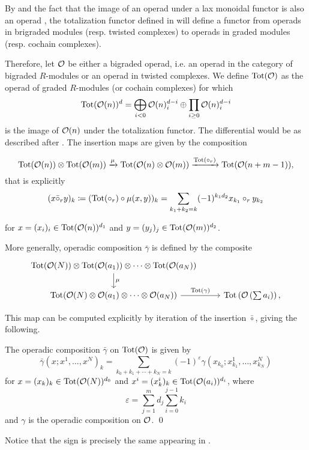 \documentclass[Thesis.tex]{subfiles}
\begin{document}
By  and the fact that the image of an operad under a lax monoidal functor is also an operad \cite[Proposition 3.1.1(a)]{fresse}, the totalization functor defined in  will define a functor from operads in brigraded modules (resp. twisted complexes) to operads in graded modules (resp. cochain complexes).

Therefore, let ${\mathcal O}$ be either a bigraded operad, i.e. an operad in the category of bigraded $R$-modules or an operad in twisted complexes. We define $\operatorname{Tot}({\mathcal O})$ as the operad of graded $R$-modules (or cochain complexes) for which \[\operatorname{Tot}({\mathcal O}(n))^d=\bigoplus_{i<0}{\mathcal O}(n)^{d-i}_i\oplus\prod_{i\geq 0} {\mathcal O}(n)^{d-i}_i\] is the image of ${\mathcal O}(n)$ under the totalization functor. The differential would be as described after . The insertion maps are given by the composition  

\begin{equation}\label{insertion}
\operatorname{Tot}({\mathcal O}(n))\otimes \operatorname{Tot}({\mathcal O}(m))\xrightarrow{\mu} \operatorname{Tot}({\mathcal O}(n)\otimes {\mathcal O}(m)) \xrightarrow{\operatorname{Tot}(\circ_r)} \operatorname{Tot}({\mathcal O}(n+m-1)),
\end{equation}
that is explicitly 
\[(x\bar{\circ}_ry)_k\coloneqq (\operatorname{Tot}(\circ_r)\circ \mu(x,y))_k=\sum_{k_1+k_2=k} (-1)^{k_1d_2} x_{k_1}\circ_r y_{k_2}\]

for $x=(x_i)_i\in \operatorname{Tot}({\mathcal O}(n))^{d_1}$ and $y=(y_j)_j\in \operatorname{Tot}({\mathcal O}(m))^{d_2}$.

More generally, operadic composition $\bar{\gamma}$ is defined by the composite
\[
\begin{tikzcd}
\Tot(\OO(N))\otimes \Tot(\OO(a_1))\otimes\cdots\otimes \Tot(\OO(a_N))\arrow[d, "\mu"]\\
 \Tot(\OO(N)\otimes \OO(a_1)\otimes\cdots\otimes \OO(a_N))\arrow[r, "\Tot(\gamma)"]& \Tot\left(\OO\left(\sum a_i\right)\right),
\end{tikzcd}
\]

This map can be computed explicitly by iteration of the insertion $\bar{\circ}$, giving the following.  %

\begin{lem}\label{totcomp}
The operadic composition $\bar{\gamma}$ on $\operatorname{Tot}({\mathcal O})$ is given by
\begin{equation*}%
\bar{\gamma}(x;x^1,\dots, x^N)_k=\sum_{k_0+k_1+\cdots+k_N=k}(-1)^{\varepsilon}\gamma(x_{k_0};x^1_{k_1},\dots, x^N_{k_N})
\end{equation*}
for $x=(x_k)_k\in\operatorname{Tot}({\mathcal O}(N))^{d_0}$ and $x^i=(x^i_k)_k\in\operatorname{Tot}({\mathcal O}(a_i))^{d_i}$, where 
\begin{equation}
\varepsilon=\sum_{j=1}^m d_j\sum_{i=0}^{j-1}k_i
\end{equation}
and $\gamma$ is the operadic composition on ${\mathcal O}$. \qed
\end{lem}
Notice that the sign is precisely the same appearing in .
\end{document}
